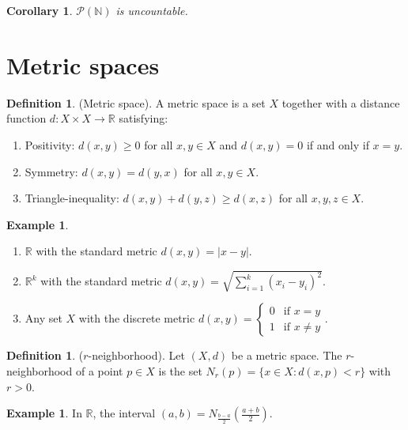 \documentclass[10pt]{article}
\newcommand{\N}{\mathbb{N}}
\newcommand{\R}{\mathbb{R}}
\newtheorem{corollary}[theorem]{Corollary}
\theoremstyle{definition}
\newtheorem{definition}[theorem]{Definition}
\newtheorem{example}[theorem]{Example}
\theoremstyle{remark}
\begin{document}
\begin{corollary}
    $\mathcal{P}(\N)$ is uncountable.
\end{corollary}

\newpage

\section{Metric spaces}

\begin{definition}
    (Metric space).
    A metric space is a set $X$ together with a distance function $d: X \times X \to \R$ satisfying:
    \begin{enumerate}
        \item Positivity: $d(x, y) \geq 0$ for all $x, y \in X$ and $d(x, y) = 0$ if and only if $x = y$.
        \item Symmetry: $d(x, y) = d(y, x)$ for all $x, y \in X$.
        \item Triangle-inequality: $d(x, y) + d(y, z) \geq d(x, z)$ for all $x, y, z \in X$.
    \end{enumerate}
\end{definition}

\begin{example} \hfill
    \begin{enumerate}
        \item $\R$ with the standard metric $d(x, y) = |x - y|$.
        \item $\R^k$ with the standard metric $d(x, y) = \sqrt{\sum_{i=1}^k (x_i - y_i)^2}$.
        \item Any set $X$ with the discrete metric $d(x, y) = \begin{cases} 0 & \text{if } x = y \\ 1 & \text{if } x \neq y \end{cases}$.
    \end{enumerate}
\end{example}

\begin{definition}
    ($r$-neighborhood).
    Let $(X, d)$ be a metric space. The $r$-neighborhood of a point $p \in X$ is the set $N_r(p) = \{x \in X : d(x, p) < r\}$ with $r > 0$.
\end{definition}

\begin{example}
    In $\R$, the interval $(a, b) = N_{\frac{b - a}{2}}\left(\frac{a + b}{2}\right)$.
\end{example}
\end{document}
